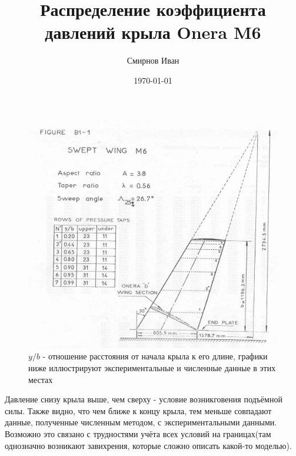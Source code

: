 \documentclass[11pt]{article}
\author{Смирнов Иван }
\date{\today}
\title{Распределение коэффициента давлений крыла Onera M6}
\begin{document}
\maketitle
\begin{figure}[h!]
\includegraphics[width = \textwidth]{onera.jpg}
\caption{$y/b$ - отношение расстояния от начала крыла к его длине, графики ниже иллюстрируют экспериментальные и численные данные в этих местах}
\end{figure}
\noindent Давление снизу крыла выше, чем сверху - условие возникговения подъёмной силы. Также видно, что чем ближе к концу крыла, тем меньше совпадают данные, полученные численным методом, с экспериментальными данными. Возможно это связано с трудностями учёта всех условий на границах(там однозначно возникают завихрения, которые сложно описать какой-то моделью).
\newpage
    
\end{document}

